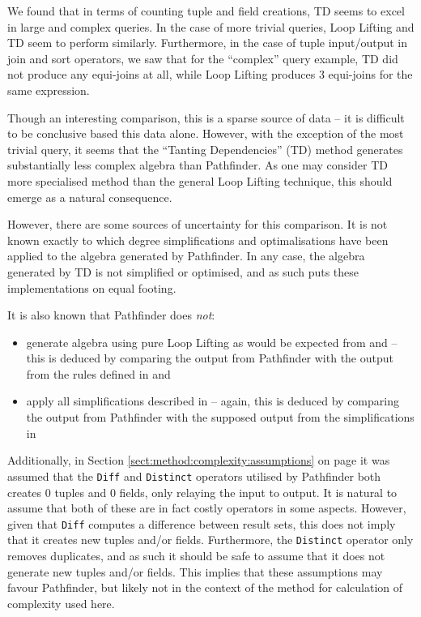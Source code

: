 We found that in terms of counting tuple and field creations, TD seems to excel
in large and complex queries. In the case of more trivial queries, Loop Lifting
and TD seem to perform similarly. Furthermore, in the case of tuple
input/output in join and sort operators, we saw that for the ``complex'' query
example, TD did not produce any equi-joins at all, while Loop Lifting produces 3
equi-joins for the same expression.

Though an interesting comparison, this is a sparse source of data -- it
is difficult to be conclusive based this data alone. However, with the
exception of the most trivial query, it seems that the ``Tanting Dependencies''
(TD) method generates substantially less complex algebra than Pathfinder. As one
may consider TD more specialised method than the general Loop Lifting
technique, this should emerge as a natural consequence.

However, there are some sources of uncertainty for this comparison. It is not
known exactly to which degree simplifications and optimalisations have been
applied to the algebra generated by Pathfinder. In any case, the
algebra generated by TD is not simplified or optimised, and as such puts these
implementations on equal footing. 

It is also known that Pathfinder does \emph{not}:
\begin{itemize}
  \item generate algebra using pure Loop Lifting as would be expected from
  \cite{pathfinder_mothertongue} and \cite{pathfinder_purelyRelational} -- this
  is deduced by comparing the output from Pathfinder with the output
  from the rules defined in \cite{pathfinder_mothertongue} and
  \cite{pathfinder_purelyRelational}
  \item apply all simplifications described in
  \cite{pathfinder_purelyRelational} -- again, this is deduced by comparing the
  output from Pathfinder with the supposed output from the simplifications in
  \cite{pathfinder_purelyRelational}
\end{itemize}

Additionally, in Section \ref{sect:method:complexity:assumptions} on page
\pageref{sect:method:complexity:assumptions} it was assumed that
the \texttt{Diff} and \texttt{Distinct} operators utilised by Pathfinder both
creates 0 tuples and 0 fields, only relaying the input to output. It is
natural to assume that both of these are in fact costly operators in some
aspects. However, given that \texttt{Diff} computes a difference between
result sets, this does not imply that it creates new tuples and/or fields.
Furthermore, the \texttt{Distinct} operator only removes duplicates, and as
such it should be safe to assume that it does not generate new tuples and/or
fields. This implies that these assumptions may favour Pathfinder, but likely
not in the context of the method for calculation of complexity used here.

